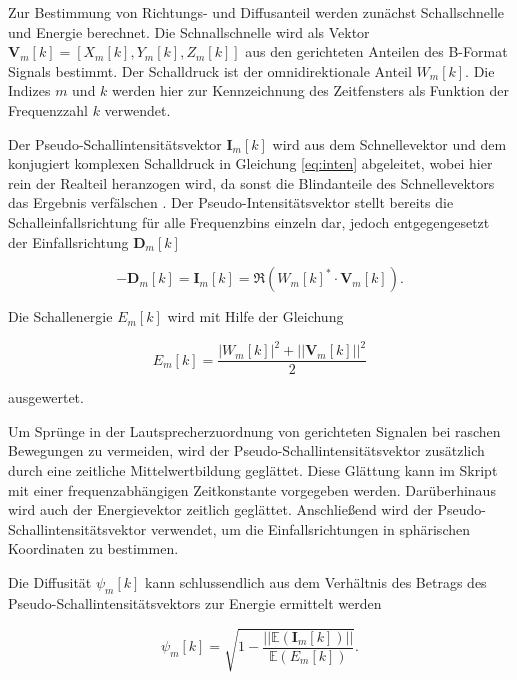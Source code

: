 Zur Bestimmung von Richtungs- und Diffusanteil werden zunächst Schallschnelle und Energie berechnet. Die Schnallschnelle wird als Vektor $\textbf{V}_{m}[k] = [X_{m}[k], Y_{m}[k], Z_{m}[k]]$ aus den gerichteten Anteilen des B-Format Signals bestimmt. Der Schalldruck ist der omnidirektionale Anteil $W_{m}[k]$. Die Indizes $m$ und $k$ werden hier zur Kennzeichnung des Zeitfensters als Funktion der Frequenzzahl $k$ verwendet.

Der Pseudo-Schallintensitätsvektor $\textbf{I}_{m}[k]$ wird aus dem Schnellevektor und dem konjugiert komplexen Schalldruck in Gleichung \ref{eq:inten} abgeleitet, wobei hier rein der Realteil heranzogen wird, da sonst die Blindanteile des Schnellevektors das Ergebnis verfälschen \cite{pulkki}. Der Pseudo-Intensitätsvektor stellt bereits die Schalleinfallsrichtung für alle Frequenzbins einzeln dar, jedoch entgegengesetzt der Einfallsrichtung $\textbf{D}_{m}[k]$

\begin{equation}
    -\textbf{D}_{m}[k] = \textbf{I}_{m}[k] = \Re(W_{m}[k]^{*} \cdot \textbf{V}_{m}[k]) .
    \label{eq:inten}
\end{equation}

Die Schallenergie $E_{m}[k]$ wird mit Hilfe der Gleichung

\begin{equation}
    E_{m}[k] = \frac{|W_{m}[k]|^2+||\textbf{V}_{m}[k]||^2}{2}
    \label{eq:energy}
\end{equation}

ausgewertet.

Um Sprünge in der Lautsprecherzuordnung von gerichteten Signalen bei raschen Bewegungen zu vermeiden, wird der Pseudo-Schallintensitätsvektor zusätzlich durch eine zeitliche Mittelwertbildung geglättet. Diese Glättung kann im Skript mit einer frequenzabhängigen Zeitkonstante vorgegeben werden. Darüberhinaus wird auch der Energievektor zeitlich geglättet. Anschließend wird der Pseudo-Schallintensitätsvektor verwendet, um die Einfallsrichtungen in sphärischen Koordinaten zu bestimmen.

Die Diffusität $\psi_{m}[k]$ kann schlussendlich aus dem Verhältnis des Betrags des Pseudo-Schallintensitätsvektors zur Energie ermittelt werden

\begin{equation}
    \psi_{m}[k] = \sqrt{1 - \frac{||\mathbb{E}(\textbf{I}_{m}[k])||}{\mathbb{E}(E_{m}[k])}} .
    \label{eq:diff}
\end{equation}


